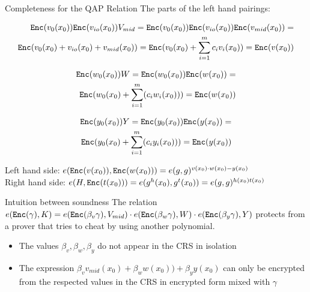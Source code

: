 \documentclass[handout]{beamer}
\begin{document}
\begin{frame}[allowframebreaks]{Completeness for the QAP Relation}
The parts of the left hand pairings:
\begin{small}
\begin{align*}
\mathtt{Enc}(v_0(x_0)) \mathtt{Enc}(v_{io}(x_0)) V_{mid} = 
\mathtt{Enc}(v_0(x_0)) \mathtt{Enc}(v_{io}(x_0)) \mathtt{Enc}(v_{mid}(x_0)) = \\
\mathtt{Enc}(v_0(x_0) + v_{io}(x_0) + v_{mid}(x_0)) = 
\mathtt{Enc}(v_0(x_0)+\sum_{i=1}^m c_i v_i(x_0)) = \mathtt{Enc}(v(x_0))
\end{align*}

\begin{align*}
\mathtt{Enc}(w_0(x_0))W= 
\mathtt{Enc}(w_0(x_0))\mathtt{Enc}(w(x_0))=\\
\mathtt{Enc}(w_0(x_0)+\sum_{i=1}^m(c_i w_i(x_0)))=\mathtt{Enc}(w(x_0))
\end{align*}

\begin{align*}
\mathtt{Enc}(y_0(x_0))Y= 
\mathtt{Enc}(y_0(x_0))\mathtt{Enc}(y(x_0))=\\
\mathtt{Enc}(y_0(x_0)+\sum_{i=1}^m(c_i y_i(x_0)))=\mathtt{Enc}(y(x_0))
\end{align*}
\end{small}

Left hand side: $e(\mathtt{Enc}(v(x_0)),\mathtt{Enc}(w(x_0)))=e(g,g)^{v(x_0) \cdot w(x_0) - y(x_0)}$\\ 

Right hand side: $e(H,\mathtt{Enc}(t(x_0)))=e(g^h(x_0),g^t(x_0))=e(g,g)^{h(x_0)t(x_0)}$
\end{frame}

\begin{frame}{Intuition between soundness}
The relation 
$e(\mathtt{Enc}(\gamma),K) = e(\mathtt{Enc}(\beta_v \gamma),V_{mid}) \cdot e(\mathtt{Enc}(\beta_w \gamma),W) \cdot e(\mathtt{Enc}(\beta_y \gamma),Y)$
protects from a prover that tries to cheat by using another polynomial. \pause
\begin{itemize}
    \item The values $\beta_v, \beta_w, \beta_y$ do not appear in the CRS in isolation \pause
    \item The expression $\beta_v v_{mid}(x_0) + \beta_w w(x_0))+\beta_y y(x_0) $ can only be encrypted from the respected values in the CRS in encrypted form mixed with $\gamma$ \pause
\end{itemize}
\end{frame}
\end{document}

